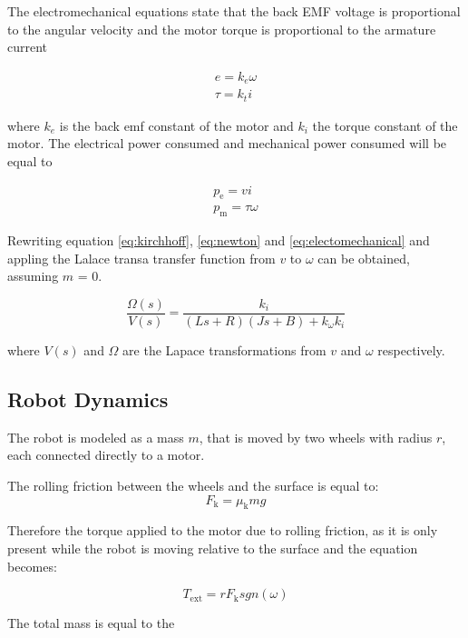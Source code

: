 \noindent
The electromechanical equations state that the back EMF voltage is proportional to the angular velocity and the motor torque is proportional to the armature current

\begin{equation}
\label{eq:electomechanical}
\begin{gathered}
e = k_{e} \omega \\
\tau = k_{t} i
\end{gathered}
\end{equation}

\noindent
where $k_{e}$ is the back emf constant of the motor and $k_{i}$ the torque constant of the motor.
The electrical power consumed and mechanical power consumed will be equal to

\begin{equation}
\begin{gathered}
p_{\text{e}} = vi \\
p_{\text{m}} = \tau\omega
\end{gathered}
\end{equation}

\noindent
Rewriting equation \ref{eq:kirchhoff}, \ref{eq:newton} and \ref{eq:electomechanical} and appling the Lalace transa transfer function from $v$ to $\omega$ can be obtained, assuming $m$ = 0.

\begin{equation}
\frac{\Omega(s)}{V(s)} = \frac{k_{i}}{(Ls + R)(Js + B) + k_{\omega}k_{i}} 
\end{equation}

where $V(s)$ and $\Omega$ are the Lapace transformations from $v$ and $\omega$ respectively.


\subsection{Robot Dynamics}
The robot is modeled as a mass $m$, that is moved by two wheels with radius $r$, each connected directly to a motor.


The rolling friction between the wheels and the surface is equal to:
\begin{equation}
F_{\text{k}} = \mu_{\text{k}}mg
\end{equation}

Therefore the torque applied to the motor due to rolling friction, as it is only present while the robot is moving relative to the surface and the equation becomes:

\begin{equation}
T_{\text{ext}} = rF_{\text{k}} sgn(\omega)
\end{equation}

\noindent
The total mass is equal to the 